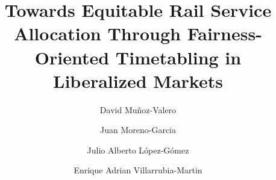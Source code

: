 \documentclass[preprint,12pt]{elsarticle}
\begin{document}
\begin{frontmatter}



\title{Towards Equitable Rail Service Allocation Through Fairness-Oriented Timetabling in Liberalized Markets} %



\author[A]{David Muñoz-Valero }
\author[A]{Juan Moreno-Garcia }
\author[B]{Julio Alberto López-Gómez }
\author[B]{Enrique Adrian Villarrubia-Martin } 

\address[A]{Escuela de Ingeniería Industrial y Aeroespacial de Toledo, Department of Technologies and Information Systems, Universidad de Castilla-La Mancha, Avenida Carlos III, s/n, Toledo, 45071, Spain}
\address[B]{Escuela Superior de Informática, Department of Technologies and Information Systems, Universidad de Castilla-La Mancha, Paseo de la Universidad 4, Ciudad Real, 13071, Spain}



\end{frontmatter}
\end{document}
